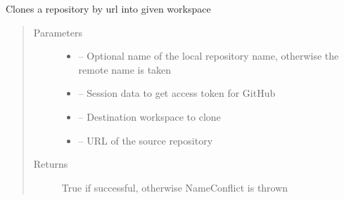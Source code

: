 \documentclass[letterpaper,10pt,english]{sphinxmanual}
\begin{document}
\begin{fulllineitems}
\label{_source/son_editor.impl:son_editor.impl.gitimpl.clone}
Clones a repository by url into given workspace
\begin{quote}\begin{description}
\item[{Parameters}] \leavevmode\begin{itemize}
\item {} 
 -- Optional name of the local repository name, otherwise the remote name is taken

\item {} 
 -- Session data to get access token for GitHub

\item {} 
 -- Destination workspace to clone

\item {} 
 -- URL of the source repository

\end{itemize}

\item[{Returns}] \leavevmode
True if successful, otherwise NameConflict is thrown

\end{description}\end{quote}

\end{fulllineitems}

\end{document}
